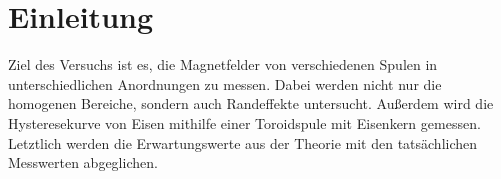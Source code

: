 \section{Einleitung}
\label{sec:Einleitung}
Ziel des Versuchs ist es, die Magnetfelder von verschiedenen Spulen in unterschiedlichen Anordnungen zu messen. 
Dabei werden nicht nur die homogenen Bereiche, sondern auch Randeffekte untersucht.
Außerdem wird die Hysteresekurve von Eisen mithilfe einer Toroidspule mit Eisenkern gemessen.
Letztlich werden die Erwartungswerte aus der Theorie mit den tatsächlichen Messwerten abgeglichen.